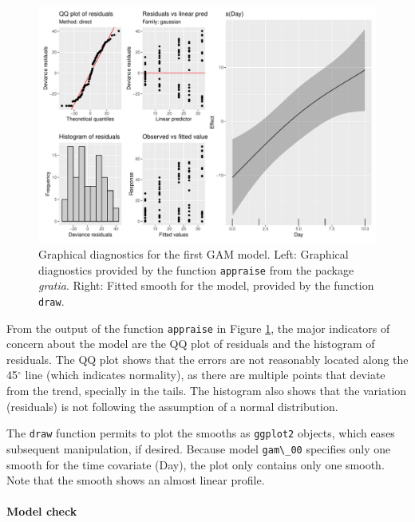 \documentclass[
]{article}
\newcommand{\passthrough}[1]{#1}
\begin{document}
\begin{figure}[H]

{\centering \includegraphics[width=0.75\linewidth,]{Full_document_files/figure-latex/first-GAM-diag-1} 

}

\caption{Graphical diagnostics for the first GAM model. Left: Graphical diagnostics provided by the function \passthrough{\lstinline!appraise!} from the package \emph{gratia}. Right: Fitted smooth for the model, provided by the function \passthrough{\lstinline!draw!}.}\label{fig:first-GAM-diag}
\end{figure}

From the output of the function \passthrough{\lstinline!appraise!} in Figure \ref{fig:first-GAM-diag}, the major indicators of concern about the model are the QQ plot of residuals and the histogram of residuals. The QQ plot shows that the errors are not reasonably located along the 45\(^{\circ}\) line (which indicates normality), as there are multiple points that deviate from the trend, specially in the tails. The histogram also shows that the variation (residuals) is not following the assumption of a normal distribution.

The \passthrough{\lstinline!draw!} function permits to plot the smooths as \passthrough{\lstinline!ggplot2!} objects, which eases subsequent manipulation, if desired. Because model \passthrough{\lstinline!gam\_00!} specifies only one smooth for the time covariate (Day), the plot only contains only one smooth. Note that the smooth shows an almost linear profile.

\hypertarget{model-check}{%
\paragraph{Model check}\label{model-check}}
\end{document}
